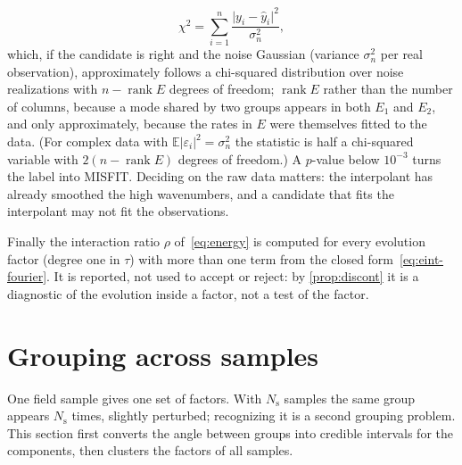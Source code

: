 \documentclass[11pt]{article}
\theoremstyle{plain}
\theoremstyle{definition}
\theoremstyle{remark}
\DeclareMathOperator{\rank}{rank}
\newcommand{\noise}{\sigma_{n}}             %
\newcommand{\Nsamp}{N_{\mathrm s}}          %
\newcommand{\lab}[1]{\textsf{#1}}           %
\newcommand{\MIS}{\lab{MISFIT}}
\newcommand{\abs}[1]{\lvert#1\rvert}
\begin{document}
\[
  \chi^2=\sum_{i=1}^{n}\frac{\abs{y_i-\hat y_i}^2}{\noise^2},
\]
which, if the candidate is right and the noise Gaussian (variance $\noise^2$ per real observation), approximately follows
a chi-squared distribution over noise realizations with $n-\rank E$ degrees of freedom; $\rank E$ rather than the number of
columns, because a mode shared by two groups appears in both $E_1$ and $E_2$, and only approximately, because the rates in
$E$ were themselves fitted to the data. (For complex data with $\mathbb E\abs{\varepsilon_i}^2=\noise^2$ the statistic is half
a chi-squared variable with $2(n-\rank E)$ degrees of freedom.) A $p$-value below $10^{-3}$
turns the label into \MIS. Deciding on the raw data matters:
the interpolant has already smoothed the high wavenumbers, and a candidate that fits the interpolant may
not fit the observations.

Finally the interaction ratio $\rho$ of~\eqref{eq:energy} is computed for every evolution factor (degree one in $\tau$) with more than one
term from the closed form~\eqref{eq:eint-fourier}. It is reported, not used to accept or reject: by
\cref{prop:discont} it is a diagnostic of the evolution inside a factor, not a test of the factor.



\section{Grouping across samples}\label{sec:across}
\label{sec:bayesian}
One field sample gives one set of factors. With $\Nsamp$ samples the same group appears $\Nsamp$ times, slightly
perturbed; recognizing it is a second grouping problem. This section first converts the angle between groups into
credible intervals for the components, then clusters the factors of all samples.

\end{document}
